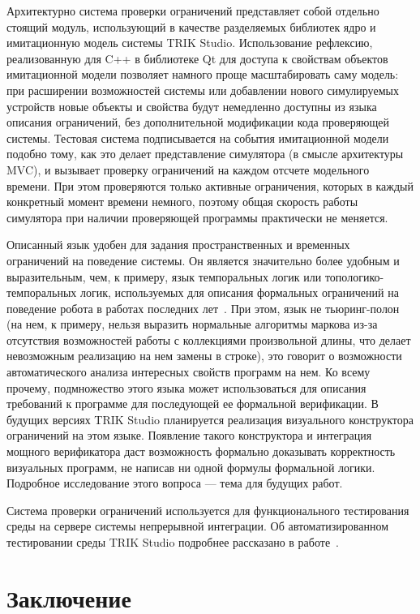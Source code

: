 \documentclass[a5paper]{article}
\begin{document}
Архитектурно система проверки ограничений представляет собой отдельно стоящий модуль, использующий в качестве разделяемых библиотек ядро и имитационную модель системы TRIK Studio. Использование рефлексию, реализованную для C++ в библиотеке Qt для доступа к свойствам объектов имитационной модели позволяет намного проще масштабировать саму модель: при расширении возможностей системы или добавлении нового симулируемых устройств новые объекты и свойства будут немедленно доступны из языка описания ограничений, без дополнительной модификации кода проверяющей системы. Тестовая система подписывается на события имитационной модели подобно тому, как это делает представление симулятора (в смысле архитектуры MVC), и вызывает проверку ограничений на каждом отсчете модельного времени. При этом проверяются только активные ограничения, которых в каждый конкретный момент времени немного, поэтому общая скорость работы симулятора при наличии проверяющей программы практически не меняется.

Описанный язык удобен для задания пространственных и временных ограничений на поведение системы. Он является значительно более удобным и выразительным, чем, к примеру, язык темпоральных логик или топологико-темпоральных логик, используемых для описания формальных ограничений на поведение робота в работах последних лет~\cite{mordvinov2016formal,kress2007s,бугайченко2007разработка,дмитриев2013адаптация}. При этом, язык не тьюринг-полон (на нем, к примеру, нельзя выразить нормальные алгоритмы маркова из-за отсутствия возможностей работы с коллекциями произвольной длины, что делает невозможным реализацию на нем замены в строке), это говорит о возможности автоматического анализа интересных свойств программ на нем. Ко всему прочему, подмножество этого языка может использоваться для описания требований к программе для последующей ее формальной верификации. В будущих версиях TRIK Studio планируется реализация визуального конструктора ограничений на этом языке. Появление такого конструктора и интеграция мощного верификатора даст возможность формально доказывать корректность визуальных программ, не написав ни одной формулы формальной логики. Подробное исследование этого вопроса --- тема для будущих работ.

Система проверки ограничений используется для функционального тестирования среды на сервере системы непрерывной интеграции. Об автоматизированном тестировании среды TRIK Studio подробнее рассказано в работе~\cite{mordvinov2016testing}.

\section*{Заключение}
\label{chapter:conclusion}
\end{document}
